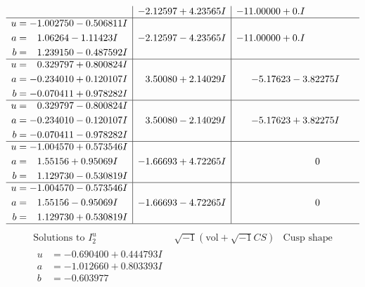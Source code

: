 \documentclass[1p]{elsarticle_modified}
\theoremstyle{definition}
\newcommand{\I}{\sqrt{-1}}
\begin{document}
$$\begin{array}{c|c|c}
 & -2.12597 + 4.23565 I & -11.00000 + 0. I\phantom{ +0.000000I} \\ \hline\begin{aligned}
u &= -1.002750 - 0.506811 I \\
a &= \phantom{-}1.06264 - 1.11423 I \\
b &= \phantom{-}1.239150 - 0.487592 I\end{aligned}
 & -2.12597 - 4.23565 I & -11.00000 + 0. I\phantom{ +0.000000I} \\ \hline\begin{aligned}
u &= \phantom{-}0.329797 + 0.800824 I \\
a &= -0.234010 + 0.120107 I \\
b &= -0.070411 + 0.978282 I\end{aligned}
 & \phantom{-}3.50080 + 2.14029 I & -5.17623 - 3.82275 I \\ \hline\begin{aligned}
u &= \phantom{-}0.329797 - 0.800824 I \\
a &= -0.234010 - 0.120107 I \\
b &= -0.070411 - 0.978282 I\end{aligned}
 & \phantom{-}3.50080 - 2.14029 I & -5.17623 + 3.82275 I \\ \hline\begin{aligned}
u &= -1.004570 + 0.573546 I \\
a &= \phantom{-}1.55156 + 0.95069 I \\
b &= \phantom{-}1.129730 - 0.530819 I\end{aligned}
 & -1.66693 + 4.72265 I & \phantom{-0.000000 } 0 \\ \hline\begin{aligned}
u &= -1.004570 - 0.573546 I \\
a &= \phantom{-}1.55156 - 0.95069 I \\
b &= \phantom{-}1.129730 + 0.530819 I\end{aligned}
 & -1.66693 - 4.72265 I & \phantom{-0.000000 } 0\\
 \hline 
 \end{array}$$\newpage$$\begin{array}{c|c|c}  
\text{Solutions to }I^u_{2}& \I (\text{vol} + \sqrt{-1}CS) & \text{Cusp shape}\\
 \hline 
\begin{aligned}
u &= -0.690400 + 0.444793 I \\
a &= -1.012660 + 0.803393 I \\
b &= -0.603977\phantom{ +0.000000I}\end{aligned}

\end{array}$$
\end{document}
